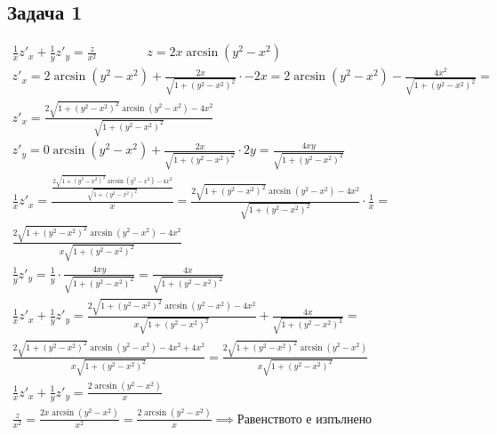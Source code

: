 \documentclass[a4paper,fleqn,12pt]{article}
\theoremstyle{definition}
\begin{document}
\subsection*{Задача 1}
\begin{gather*}
\frac{1}{x} z'_x + \frac{1}{y} z'_y = \frac{z}{x^2} \qquad \qquad z = 2x\arcsin(y^2- x^2) \\
z'_x = 2\arcsin(y^2 - x^2) + \frac{2x}{\sqrt{1 + (y^2 - x^2)^2}} \cdot -2x = 
2\arcsin(y^2 - x^2) - \frac{4x^2}{\sqrt{1 + (y^2 - x^2)^2}} = \\
z'_x = \frac{2\sqrt{1 + (y^2 - x^2)^2}\arcsin(y^2 - x^2) - 4x^2}{\sqrt{1 + (y^2 - x^2)^2}} \\
z'_y = 0\arcsin(y^2 - x^2) + \frac{2x}{\sqrt{1 + (y^2 - x^2)^2}} \cdot 2y =  \frac{4xy}{\sqrt{1 + (y^2 - x^2)^2}}\\
\frac{1}{x} z'_x= \frac{\frac{2\sqrt{1 + (y^2 - x^2)^2}\arcsin(y^2 - x^2) - 4x^2}{\sqrt{1 + (y^2 - x^2)^2}}}{x} =
\frac{2\sqrt{1 + (y^2 - x^2)^2}\arcsin(y^2 - x^2) - 4x^2}{\sqrt{1 + (y^2 - x^2)^2}} \cdot \frac{1}{x} = \\
\frac{2\sqrt{1 + (y^2 - x^2)^2}\arcsin(y^2 - x^2) - 4x^2}{x\sqrt{1 + (y^2 - x^2)^2}} \\
\frac{1}{y} z'_y = \frac{1}{y} \cdot \frac{4xy}{\sqrt{1 + (y^2 - x^2)^2}} = \frac{4x}{\sqrt{1 + (y^2 - x^2)^2}} \\
\frac{1}{x} z'_x + \frac{1}{y} z'_y  = \frac{2\sqrt{1 + (y^2 - x^2)^2}\arcsin(y^2 - x^2) - 4x^2}{x\sqrt{1 + (y^2 - x^2)^2}}  + \frac{4x}{\sqrt{1 + (y^2 - x^2)^2}} = \\
\frac{2\sqrt{1 + (y^2 - x^2)^2}\arcsin(y^2 - x^2) - 4x^2 + 4x^2}{x\sqrt{1 + (y^2 - x^2)^2}} = 
\frac{2\sqrt{1 + (y^2 - x^2)^2}\arcsin(y^2 - x^2)}{x\sqrt{1 + (y^2 - x^2)^2}} \\
\frac{1}{x} z'_x + \frac{1}{y} z'_y = \frac{2\arcsin(y^2 - x^2)}{x} \\
\frac{z}{x^2} = \frac{2x\arcsin(y^2- x^2)}{x^2} =  \frac{2\arcsin(y^2- x^2)}{x} \implies \text{Равенството е изпълнено}
\end{gather*}
\end{document}
